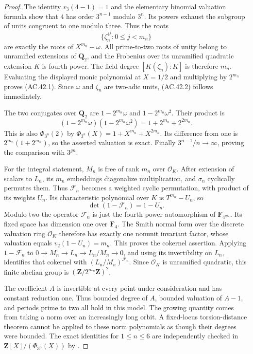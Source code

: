 \begin{proof}
The identity $v_3(4-1)=1$ and the elementary binomial valuation formula
show that $4$ has order $3^{n-1}$ modulo $3^n$. Its powers exhaust
the subgroup of units congruent to one modulo three. Thus the roots
\[
 \{\zeta_n^{4^j}:0\le j<m_n\}
\]
are exactly the roots of $X^{m_n}-\omega$. All prime-to-two roots of
unity belong to unramified extensions of $\mathbf Q_2$, and the
Frobenius over its unramified quadratic extension $K$ is fourth
power. The field degree $[K(\zeta_n):K]$ is therefore $m_n$.
Evaluating the displayed monic polynomial at $X=1/2$ and multiplying
by $2^{m_n}$ proves (AC.42.1). Since $\omega$ and $\zeta_n$ are
two-adic units, (AC.42.2) follows immediately.

The two conjugates over $\mathbf Q_2$ are
$1-2^{m_n}\omega$ and $1-2^{m_n}\omega^2$. Their product is
\[
 (1-2^{m_n}\omega)(1-2^{m_n}\omega^2)
   =1+2^{m_n}+2^{2m_n}.
\]
This is also $\Phi_{3^n}(2)$ by
$\Phi_{3^n}(X)=1+X^{m_n}+X^{2m_n}$. Its difference from one
is $2^{m_n}(1+2^{m_n})$, so the asserted valuation is exact.
Finally $3^{n-1}/n\to\infty$, proving the comparison with $3^{gn}$.

For the integral statement, $M_n$ is free of rank $m_n$ over
$\mathcal O_K$. After extension of scalars to $L_n$, its $m_n$
embeddings diagonalize multiplication, and $\sigma_n$ cyclically
permutes them. Thus $\mathcal F_n$ becomes a weighted cyclic
permutation, with product of its weights $U_n$. Its characteristic
polynomial over $K$ is $T^{m_n}-U_n$, so
\[
                 \det(1-\mathcal F_n)=1-U_n.
\]
Modulo two the operator $\mathcal F_n$ is just the fourth-power
automorphism of $\mathbf F_{4^{m_n}}$. Its fixed space has dimension
one over $\mathbf F_4$. The Smith normal form over the discrete
valuation ring $\mathcal O_K$ therefore has exactly one nonunit
invariant factor, whose valuation equals $v_2(1-U_n)=m_n$.
This proves the cokernel assertion. Applying $1-\mathcal F_n$ to
$0\to M_n\to L_n\to L_n/M_n\to0$, and using its invertibility on
$L_n$, identifies that cokernel with $(L_n/M_n)^{\mathcal F_n}$.
Since $\mathcal O_K$ is unramified quadratic, this finite abelian
group is $(\mathbf Z/2^{m_n}\mathbf Z)^2$.

The coefficient $A$ is invertible at every point under consideration
and has constant reduction one. Thus bounded degree of $A$, bounded
valuation of $A-1$, and periods prime to two all hold in this model.
The growing quantity comes from taking a norm over an increasingly
long orbit. A fixed-locus torsion-distance theorem cannot be applied
to these norm polynomials as though their degrees were bounded.
The exact identities for $1\le n\le6$ are independently checked in
$\mathbf Z[X]/(\Phi_{3^n}(X))$ by
.
\end{proof}


